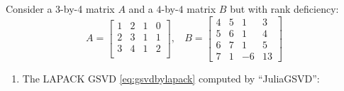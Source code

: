 \newpage
\begin{example} \label{eg:case1b} 
{\rm 
Consider a 3-by-4 matrix $A$ and a $4$-by-$4$ matrix $B$ but with rank deficiency:
        \begin{equation*}
            A = \begin{bmatrix}
                1 & 2 & 1 & 0\\
                2 & 3 & 1 & 1\\
                3 & 4 & 1 & 2\\
            \end{bmatrix}, \ \ \ \
            B = \begin{bmatrix}
                4 & 5 & 1 & 3 \\
                5 & 6 & 1 & 4 \\
                6 & 7 & 1 & 5 \\
                7 & 1 & -6 & 13
            \end{bmatrix}
        \end{equation*}
\begin{enumerate}[(1).]

\item The LAPACK GSVD \eqref{eq:gsvdbylapack} computed by ``JuliaGSVD'': 
            

\end{enumerate}}
\end{example}
